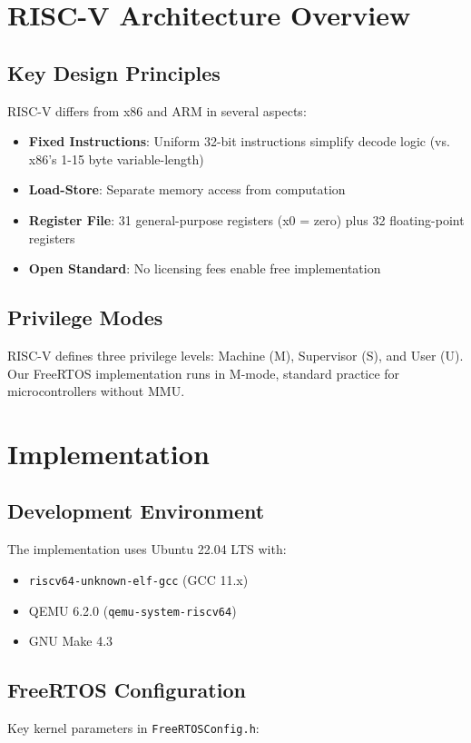 \documentclass[conference]{IEEEtran}
\begin{document}
\section{RISC-V Architecture Overview}

\subsection{Key Design Principles}
RISC-V differs from x86 and ARM in several aspects:

\begin{itemize}
    \item \textbf{Fixed Instructions}: Uniform 32-bit instructions simplify decode logic (vs. x86's 1-15 byte variable-length)
    \item \textbf{Load-Store}: Separate memory access from computation
    \item \textbf{Register File}: 31 general-purpose registers (x0 = zero) plus 32 floating-point registers
    \item \textbf{Open Standard}: No licensing fees enable free implementation
\end{itemize}

\subsection{Privilege Modes}
RISC-V defines three privilege levels: Machine (M), Supervisor (S), and User (U). Our FreeRTOS implementation runs in M-mode, standard practice for microcontrollers without MMU.

\section{Implementation}

\subsection{Development Environment}
The implementation uses Ubuntu 22.04 LTS with:
\begin{itemize}
    \item \texttt{riscv64-unknown-elf-gcc} (GCC 11.x)
    \item QEMU 6.2.0 (\texttt{qemu-system-riscv64})
    \item GNU Make 4.3
\end{itemize}

\subsection{FreeRTOS Configuration}
Key kernel parameters in \texttt{FreeRTOSConfig.h}:
\end{document}
